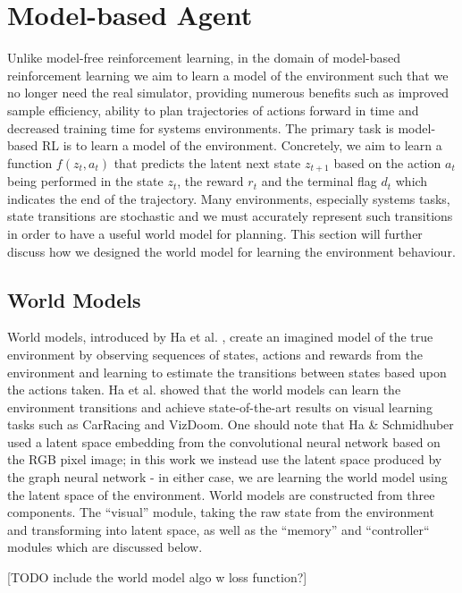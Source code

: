 \section{Model-based Agent}

Unlike model-free reinforcement learning, in the domain of model-based reinforcement learning we aim to learn a model of the environment such that we no longer need the real simulator, providing numerous benefits such as improved sample efficiency, ability to plan trajectories of actions forward in time and decreased training time for systems environments. The primary task is model-based RL is to learn a model of the environment. Concretely, we aim to learn a function $f(z_t, a_t)$ that predicts the latent next state $z_{t+1}$ based on the action $a_t$ being performed in the state $z_t$, the reward $r_t$ and the terminal flag $d_t$ which indicates the end of the trajectory. Many environments, especially systems tasks, state transitions are stochastic and we must accurately represent such transitions in order to have a useful world model for planning. This section will further discuss how we designed the world model for learning the environment behaviour.

\subsection{World Models}
World models, introduced by Ha et al. \cite{ha2018worldmodels}, create an imagined model of the true environment by observing sequences of states, actions and rewards from the environment and learning to estimate the transitions between states based upon the actions taken. Ha et al. showed that the world models can learn the environment transitions and achieve state-of-the-art results on visual learning tasks such as CarRacing and VizDoom. One should note that Ha \& Schmidhuber used  a latent space embedding from the convolutional neural network based on the RGB pixel image; in this work we instead use the latent space produced by the graph neural network - in either case, we are learning the world model using the latent space of the environment. World models are constructed from three components. The ``visual'' module, taking the raw state from the environment and transforming into latent space, as well as the ``memory''  and ``controller`` modules which are discussed below.

[TODO include the world model algo w loss function?]

